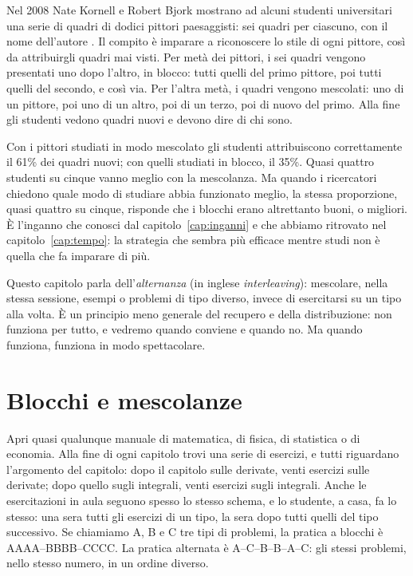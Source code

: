 Nel 2008 Nate Kornell e Robert Bjork mostrano ad alcuni studenti
universitari una serie di quadri di dodici pittori paesaggisti: sei quadri per ciascuno, con il nome
dell'autore \parencite{kornell2008}. Il compito è imparare a
riconoscere lo stile di ogni pittore, così da attribuirgli quadri mai
visti. Per metà dei pittori, i sei quadri vengono presentati uno dopo
l'altro, in blocco: tutti quelli del primo pittore, poi tutti quelli
del secondo, e così via. Per l'altra metà, i quadri vengono mescolati:
uno di un pittore, poi uno di un altro, poi di un terzo, poi di nuovo
del primo. Alla fine gli studenti vedono quadri nuovi
e devono dire di chi sono.

Con i pittori studiati in modo mescolato gli studenti attribuiscono
correttamente il 61\% dei quadri nuovi; con quelli studiati in blocco,
il 35\%. Quasi quattro studenti su cinque vanno meglio con la
mescolanza. Ma quando i ricercatori chiedono quale modo di studiare
abbia funzionato meglio, la stessa proporzione, quasi quattro su
cinque, risponde che i blocchi erano altrettanto buoni, o migliori. È
l'inganno che conosci dal capitolo~\ref{cap:inganni} e che abbiamo
ritrovato nel capitolo~\ref{cap:tempo}: la strategia che sembra più
efficace mentre studi non è quella che fa imparare di più.

Questo capitolo parla dell'\emph{alternanza} (in inglese
\emph{interleaving}): mescolare, nella stessa sessione, esempi o
problemi di tipo diverso, invece di esercitarsi su un tipo alla volta.
È un principio meno generale del recupero e della distribuzione: non
funziona per tutto, e vedremo quando conviene e quando no. Ma quando
funziona, funziona in modo spettacolare.

\section{Blocchi e mescolanze}

Apri quasi qualunque manuale di matematica, di fisica, di statistica o
di economia. Alla fine di ogni capitolo trovi una serie di esercizi, e
tutti riguardano l'argomento del capitolo: dopo il capitolo sulle
derivate, venti esercizi sulle derivate; dopo quello sugli integrali,
venti esercizi sugli integrali. Anche le esercitazioni in aula seguono
spesso lo stesso schema, e lo studente, a casa, fa lo stesso: una sera
tutti gli esercizi di un tipo, la sera dopo tutti quelli del tipo
successivo. Se chiamiamo A, B e C tre tipi di problemi, la pratica a
blocchi è AAAA--BBBB--CCCC. La pratica alternata è A--C--B--B--A--C:
gli stessi problemi, nello stesso numero, in un ordine diverso.


